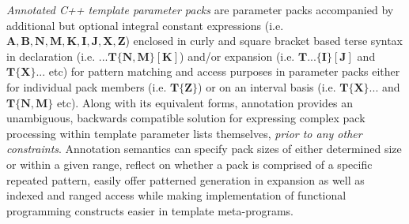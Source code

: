 \p \textit{Annotated C++ template parameter packs} are parameter packs accompanied by additional but optional integral constant expressions (i.e. $\bm{A,B,N,M,K,I,J,X,Z}$) enclosed in curly and square bracket based terse syntax in declaration (i.e. $\bm{...T\{N,M\}[K]}$) and/or expansion (i.e. $\bm{T...\{I\}[J]}$ and $\bm{T\{X\}...}$ etc) for pattern matching and access purposes in parameter packs either for individual pack members (i.e. $\bm{T\{Z\}}$) or on an interval basis (i.e. $\bm{T\{X\}}...$ and $\bm{T\{N,M\}}$ etc).
Along with its equivalent forms, annotation provides an unambiguous, backwards compatible solution for expressing complex pack processing within template parameter lists themselves, \textit{prior to any other constraints}.
Annotation semantics can specify pack sizes of either determined size or within a given range, reflect on whether a pack is comprised of a specific repeated pattern, easily offer patterned generation in expansion as well as indexed and ranged access while making implementation of functional programming constructs easier in template meta-programs.
